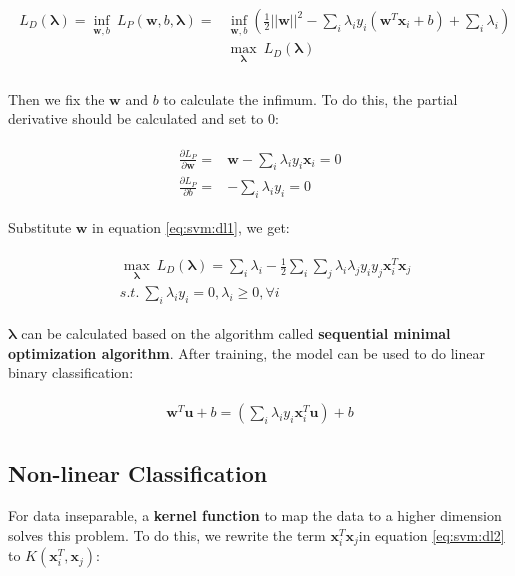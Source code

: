 \begin{align}
\begin{split}
L_D(\mathbf{\lambda}) = \inf_{\mathbf{w}, b} \ L_P(\mathbf{w}, b, \mathbf{\lambda}) =& \inf_{\mathbf{w}, b} \left( \frac{1}{2}||\mathbf{w}||^2 - \sum_i\lambda_i y_i(\mathbf{w}^T\mathbf{x}_i+b) + \sum_i\lambda_i \right)\\
&\max_\mathbf{\lambda} \ L_D(\mathbf{\lambda}) \\
\label{eq:svm:dl1}
\end{split}
\end{align}

Then we fix the $\mathbf{w}$ and $b$ to calculate the infimum. 
To do this, the partial derivative should be calculated and set to $0$:

\begin{align}
\begin{split}
\frac{\partial{L_P}}{\partial{\mathbf{w}}} =& \mathbf{w} - \sum_i\lambda_iy_i\mathbf{x}_i = 0 \\
\frac{\partial{L_P}}{\partial{b}} =& -\sum_i\lambda_iy_i = 0
\end{split}
\end{align}

Substitute $\mathbf{w}$ in equation \ref{eq:svm:dl1}, we get:

\begin{align}
\begin{split}
&\max_\mathbf{\lambda} \ L_D(\mathbf{\lambda}) = \sum_i\lambda_i - \frac{1}{2} \sum_i\sum_j\lambda_i\lambda_jy_iy_j\mathbf{x}_i^T\mathbf{x}_j\\
 &s.t. \ \sum_i\lambda_iy_i = 0, \lambda_i \geq 0, \forall i
\label{eq:svm:dl2}
\end{split}
\end{align}

$\mathbf{\lambda}$ can be calculated based on the algorithm called \textbf{sequential minimal optimization algorithm}. After training, the model can be used to do linear binary classification:

\begin{align}
\begin{split}
\mathbf{w}^T \mathbf{u} + b =  \left(\sum_i\lambda_iy_i\mathbf{x}_i^T\mathbf{u}\right) + b 
\end{split}
\end{align}

\subsection{Non-linear Classification}
For data inseparable, a \textbf{kernel function} to map the data to a higher dimension solves this problem. 
To do this, we rewrite the term $ \mathbf{x}_i^T\mathbf{x}_j $in equation \ref{eq:svm:dl2} to $K(\mathbf{x}_i^T, \mathbf{x}_j )$:

